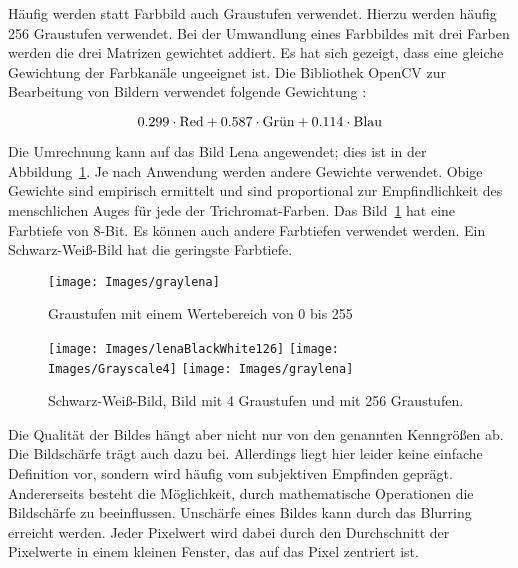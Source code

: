 Häufig werden statt Farbbild auch Graustufen verwendet. Hierzu werden häufig 256 Graustufen verwendet.%
Bei der Umwandlung eines Farbbildes mit drei Farben werden die drei Matrizen gewichtet addiert. Es hat sich gezeigt, dass eine gleiche Gewichtung der Farbkanäle ungeeignet ist. Die Bibliothek OpenCV zur Bearbeitung von Bildern verwendet folgende Gewichtung \cite{OpenCV:2020b}:

$$0.299 \cdot \hbox{Red} +0.587 \cdot \hbox{Grün} +0.114 \cdot \hbox{Blau}$$

Die Umrechnung kann auf das Bild \glqq Lena \grqq{} angewendet; dies ist in der Abbildung~\ref{Bild:lenaGray}. Je nach Anwendung werden andere Gewichte verwendet. 
Obige Gewichte sind empirisch ermittelt und sind proportional zur
Empfindlichkeit des menschlichen Auges für jede der Trichromat-Farben. 
Das Bild~\ref{Bild:lenaGray} hat eine Farbtiefe von 8-Bit. Es können auch andere Farbtiefen verwendet werden. Ein Schwarz-Weiß-Bild hat die geringste Farbtiefe. 

\begin{figure}[!h]
	\begin{center}
		
		\texttt{[image: Images/graylena]}
		
		\caption{Graustufen mit einem Wertebereich von 0 bis 255}\label{Bild:lenaGray}
	\end{center}    
\end{figure}




\begin{figure}[!h]
	\begin{center}
		
		
		\texttt{[image: Images/lenaBlackWhite126]}
		\quad
		\texttt{[image: Images/Grayscale4]}
		\quad
		\texttt{[image: Images/graylena]}
		
		\caption{Schwarz-Weiß-Bild, Bild mit 4 Graustufen und mit 256 Graustufen.}\label{Bild:}
	\end{center}    
\end{figure}


Die Qualität der Bildes hängt aber nicht nur von den genannten Kenngrößen ab. Die Bildschärfe trägt auch dazu bei. Allerdings liegt hier leider keine einfache Definition vor, sondern wird häufig vom subjektiven Empfinden geprägt. Andererseits besteht die Möglichkeit, durch mathematische Operationen die Bildschärfe zu beeinflussen.  Unschärfe eines Bildes kann durch das Blurring erreicht werden. 
Jeder Pixelwert wird dabei durch den Durchschnitt der Pixelwerte in einem kleinen Fenster, das auf das Pixel zentriert ist. 

